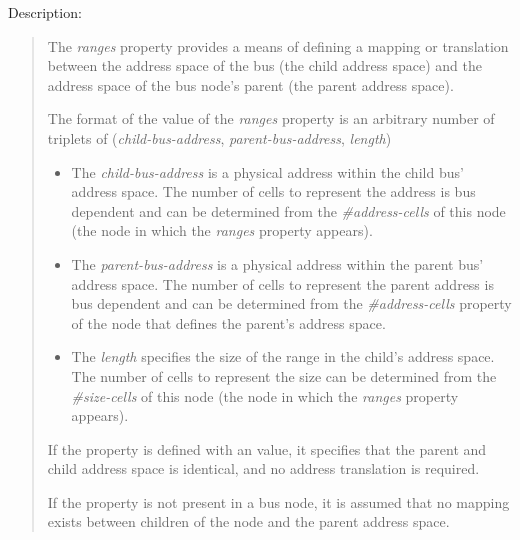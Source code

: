 \documentclass[a4paper,10pt,oneside]{sphinxmanual}
\begin{document}
Description:
\begin{quote}

The \emph{ranges} property provides a means of defining a mapping or
translation between the address space of the bus (the child address
space) and the address space of the bus node’s parent (the parent
address space).

The format of the value of the \emph{ranges} property is an arbitrary number
of triplets of (\emph{child-bus-address}, \emph{parent-bus-address}, \emph{length})
\begin{itemize}
\item {} 
The \emph{child-bus-address} is a physical address within the child bus'
address space. The number of cells to represent the address is bus
dependent and can be determined from the \emph{\#address-cells} of this node
(the node in which the \emph{ranges} property appears).

\item {} 
The \emph{parent-bus-address} is a physical address within the parent bus'
address space. The number of cells to represent the parent address is
bus dependent and can be determined from the \emph{\#address-cells} property
of the node that defines the parent’s address space.

\item {} 
The \emph{length} specifies the size of the range in the child’s address space. The number
of cells to represent the size can be determined from the \emph{\#size-cells}
of this node (the node in which the \emph{ranges} property appears).

\end{itemize}

If the property is defined with an  value, it specifies that the
parent and child address space is identical, and no address translation
is required.

If the property is not present in a bus node, it is assumed that no
mapping exists between children of the node and the parent address
space.
\end{quote}
\end{document}
